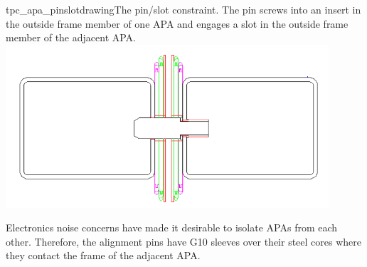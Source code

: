 \begin{cdrfigure}{tpc_apa_pinslotdrawing}{The pin/slot constraint.  The pin screws into an insert in the outside frame member of one APA and engages a slot in the outside frame member of the adjacent APA.}
\includegraphics[width=0.9\textwidth]{figures/tpc_apa_pinslotdrawing.png} 
\end{cdrfigure}

Electronics noise concerns have made it desirable to isolate APAs from each other.  Therefore, the alignment pins have G10 sleeves over their steel cores where they contact the frame of the adjacent APA.


